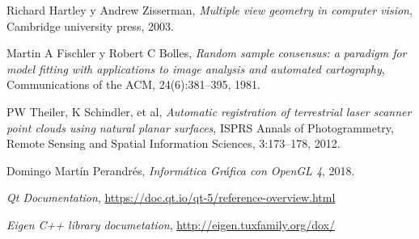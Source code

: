 \documentclass[a4paper,11pt]{book}
\begin{document}
\begin{thebibliography}{X}
	 Richard Hartley y Andrew Zisserman, \textsl{Multiple view geometry in computer vision}, Cambridge university press, 2003.
	
	 Martin A Fischler y Robert C Bolles, \textsl{Random sample consensus: a paradigm for model fitting with applications to image analysis and automated cartography}, Communications of the ACM, 24(6):381–395, 1981.
	
	 PW Theiler, K Schindler, et al, \textsl{Automatic registration of terrestrial laser scanner point clouds using natural planar surfaces}, ISPRS Annals of Photogrammetry, Remote Sensing and Spatial	Information Sciences, 3:173–178, 2012.
	
	 Domingo Martín Perandrés, \textsl{Informática Gráfica con OpenGL 4}, 2018.
	
	 \textsl{Qt Documentation}, \url{https://doc.qt.io/qt-5/reference-overview.html}
	
	 \textsl{Eigen C++ library documetation}, \url{http://eigen.tuxfamily.org/dox/}
\end{thebibliography}

%
%
%
%
%
%
%
%
%
%
%
%
%
%
%
%
%
%
%
%
%
\end{document}
